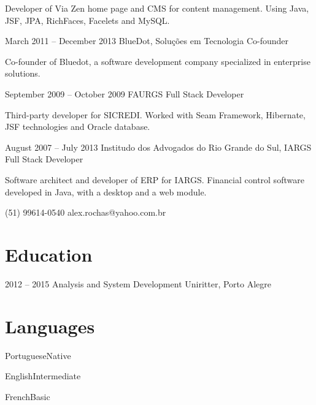 \documentclass{tccv}
\begin{document}
\begin{eventlist}
    Developer of Via Zen home page and CMS for content management. Using Java, JSF, JPA, RichFaces, Facelets and MySQL.

\item{March 2011 -- December 2013}
    {BlueDot, Soluções em Tecnologia}
    {Co-founder}

    Co-founder of Bluedot, a software development company specialized in enterprise solutions.

\item{September 2009 -- October 2009}
    {FAURGS}
    {Full Stack Developer}

    Third-party developer for SICREDI\@. Worked with Seam Framework, Hibernate, JSF technologies and Oracle
    database.


\item{August 2007 -- July 2013}
    {Institudo dos Advogados do Rio Grande do Sul, IARGS}
    {Full Stack Developer}

    Software architect and developer of ERP for IARGS\@.
    Financial control software developed in Java, with a desktop and a web module.

\end{eventlist}

{(51) 99614-0540 }
{alex.rochas@yahoo.com.br}

\section{Education}

\begin{yearlist}

\item{2012 -- 2015}
    {Analysis and System Development}
    {Uniritter, Porto Alegre}

\end{yearlist}

\section{Languages}

\begin{factlist}
\item{Portuguese}{Native}
\item{English}{Intermediate}
\item{French}{Basic}
\end{factlist}
\end{document}
